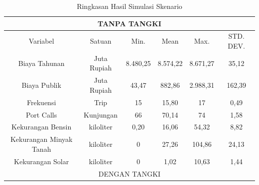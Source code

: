 \begin{table}[!ht]
    \centering
    \caption{Ringkasan Hasil Simulasi Skenario}
    \label{tabel:ringkasan-hasil}
    \begin{tabular}{|cccccc|}
    \hline
    \multicolumn{6}{|c|}{TANPA TANGKI}                                                                                                                                                           \\ \hline
    \multicolumn{1}{|c|}{Variabel}                & \multicolumn{1}{c|}{Satuan}      & \multicolumn{1}{c|}{Min.}     & \multicolumn{1}{c|}{Mean}     & \multicolumn{1}{c|}{Max.}     & STD. DEV. \\ \hline
    \multicolumn{1}{|c|}{Biaya Tahunan}           & \multicolumn{1}{c|}{Juta Rupiah} & \multicolumn{1}{c|}{8.480,25} & \multicolumn{1}{c|}{8.574,22} & \multicolumn{1}{c|}{8.671,27} & 35,12     \\ \hline
    \multicolumn{1}{|c|}{Biaya Publik}            & \multicolumn{1}{c|}{Juta Rupiah} & \multicolumn{1}{c|}{43,47}    & \multicolumn{1}{c|}{882,86}   & \multicolumn{1}{c|}{2.988,31} & 162,39    \\ \hline
    \multicolumn{1}{|c|}{Frekuensi}               & \multicolumn{1}{c|}{Trip}        & \multicolumn{1}{c|}{15}       & \multicolumn{1}{c|}{15,80}    & \multicolumn{1}{c|}{17}       & 0,49      \\ \hline
    \multicolumn{1}{|c|}{Port Calls}              & \multicolumn{1}{c|}{Kunjungan}   & \multicolumn{1}{c|}{66}       & \multicolumn{1}{c|}{70,14}    & \multicolumn{1}{c|}{74}       & 1,58      \\ \hline
    \multicolumn{1}{|c|}{Kekurangan Bensin}       & \multicolumn{1}{c|}{kiloliter}   & \multicolumn{1}{c|}{0,20}     & \multicolumn{1}{c|}{16,06}    & \multicolumn{1}{c|}{54,32}    & 8,82      \\ \hline
    \multicolumn{1}{|c|}{Kekurangan Minyak Tanah} & \multicolumn{1}{c|}{kiloliter}   & \multicolumn{1}{c|}{0}        & \multicolumn{1}{c|}{27,26}    & \multicolumn{1}{c|}{104,86}   & 24,13     \\ \hline
    \multicolumn{1}{|c|}{Kekurangan Solar}        & \multicolumn{1}{c|}{kiloliter}   & \multicolumn{1}{c|}{0}        & \multicolumn{1}{c|}{1,02}     & \multicolumn{1}{c|}{10,63}    & 1,44      \\ \hline
    \multicolumn{6}{|c|}{{\color[HTML]{000000} DENGAN TANGKI}}                                                                                                                                   \\ \hline

\end{tabular}
\end{table}
